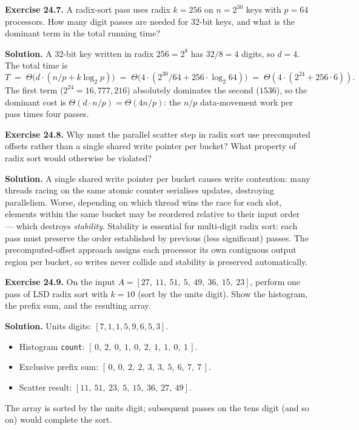\begin{ppexercises}
\textbf{Exercise 24.7.} A radix-sort pass uses radix $k = 256$ on
$n = 2^{30}$ keys with $p = 64$ processors. How many digit passes are
needed for 32-bit keys, and what is the dominant term in the total
running time?

\medskip
\textbf{Solution.} A 32-bit key written in radix $256 = 2^8$ has
$32 / 8 = 4$ digits, so $d = 4$. The total time is
\[
T \;=\; \Theta\!\bigl(d \cdot (n/p + k \log_2 p)\bigr)
\;=\; \Theta\!\bigl(4 \cdot (2^{30} / 64 + 256 \cdot \log_2 64)\bigr)
\;=\; \Theta(4 \cdot (2^{24} + 256 \cdot 6)).
\]
The first term ($2^{24} = 16{,}777{,}216$) absolutely dominates the
second ($1536$), so the dominant cost is $\Theta(d \cdot n / p) = \Theta(4 n / p)$:
the $n/p$ data-movement work per pass times four passes.
\end{ppexercises}

\begin{ppexercises}
\textbf{Exercise 24.8.} Why must the parallel scatter step in radix sort
use precomputed offsets rather than a single shared write pointer per
bucket? What property of radix sort would otherwise be violated?

\medskip
\textbf{Solution.} A single shared write pointer per bucket causes
write contention: many threads racing on the same atomic counter
serialises updates, destroying parallelism. Worse, depending on which
thread wins the race for each slot, elements within the same bucket
may be reordered relative to their input order --- which destroys
\emph{stability}. Stability is essential for multi-digit radix sort:
each pass must preserve the order established by previous (less
significant) passes. The precomputed-offset approach assigns each
processor its own contiguous output region per bucket, so writes never
collide and stability is preserved automatically.
\end{ppexercises}

\begin{ppexercises}
\textbf{Exercise 24.9.} On the input $A = [27,\ 11,\ 51,\ 5,\ 49,\
36,\ 15,\ 23]$, perform one pass of LSD radix sort with $k = 10$
(sort by the units digit). Show the histogram, the prefix sum, and
the resulting array.

\medskip
\textbf{Solution.} Units digits: $[7, 1, 1, 5, 9, 6, 5, 3]$.
\begin{itemize}[leftmargin=*]
  \item Histogram \texttt{count}:
        $[\,0,\ 2,\ 0,\ 1,\ 0,\ 2,\ 1,\ 1,\ 0,\ 1\,]$.
  \item Exclusive prefix sum:
        $[\,0,\ 0,\ 2,\ 2,\ 3,\ 3,\ 5,\ 6,\ 7,\ 7\,]$.
  \item Scatter result: $[11,\ 51,\ 23,\ 5,\ 15,\ 36,\ 27,\ 49]$.
\end{itemize}
The array is sorted by the units digit; subsequent passes on the tens
digit (and so on) would complete the sort.
\end{ppexercises}

